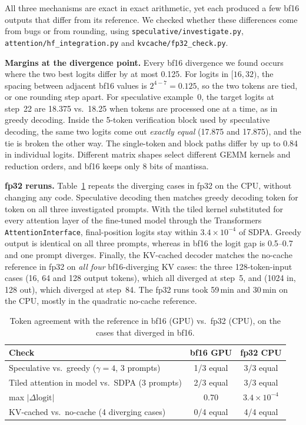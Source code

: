 All three mechanisms are exact in exact arithmetic, yet each produced a few bf16 outputs that differ from its
reference. We checked whether these differences come from bugs or from rounding, using
\texttt{speculative/investigate.py}, \texttt{attention/hf\_integration.py} and \texttt{kvcache/fp32\_check.py}.

\textbf{Margins at the divergence point.} Every bf16 divergence we found occurs where the two best logits
differ by at most 0.125. For logits in $[16,32)$, the spacing between adjacent bf16 values is $2^{4-7}=0.125$,
so the two tokens are tied, or one rounding step apart. For speculative example~0, the target logits at
step~22 are 18.375 vs.\ 18.25 when tokens are processed one at a time, as in greedy decoding. Inside the
5-token verification block used by speculative decoding, the same two logits come out \emph{exactly equal}
(17.875 and 17.875), and the tie is broken the other way. The single-token and block paths differ by up to 0.84
in individual logits. Different matrix shapes select different GEMM kernels and reduction orders, and bf16
keeps only 8 bits of mantissa.

\textbf{fp32 reruns.} Table~\ref{tab:fp32} repeats the diverging cases in fp32 on the CPU, without changing any
code. Speculative decoding then matches greedy decoding token for token on all three investigated prompts.
With the tiled kernel substituted for every attention layer of the fine-tuned model through the Transformers
\texttt{AttentionInterface}, final-position logits stay within $3.4\times10^{-4}$ of SDPA. Greedy output is
identical on all three prompts, whereas in bf16 the logit gap is 0.5--0.7 and one prompt diverges.
Finally, the KV-cached decoder matches the no-cache reference in fp32 on \emph{all four} bf16-diverging KV
cases: the three 128-token-input cases (16, 64 and 128 output tokens), which all diverged at step~5, and
(1024 in, 128 out), which diverged at step~84. The fp32 runs took 59\,min and 30\,min on the CPU, mostly in the
quadratic no-cache reference.

\begin{table}[t]
\centering
\footnotesize
\caption{Token agreement with the reference in bf16 (GPU) vs.\ fp32 (CPU), on the cases that diverged in
bf16.}
\label{tab:fp32}
\begin{tabular}{lcc}
\toprule
Check & bf16 GPU & fp32 CPU \\
\midrule
Speculative vs.\ greedy ($\gamma{=}4$, 3 prompts) & 1/3 equal & 3/3 equal \\
Tiled attention in model vs.\ SDPA (3 prompts) & 2/3 equal & 3/3 equal \\
\quad max $|\Delta\text{logit}|$ & 0.70 & $3.4\times10^{-4}$ \\
KV-cached vs.\ no-cache (4 diverging cases) & 0/4 equal & 4/4 equal \\
\bottomrule
\end{tabular}
\end{table}

